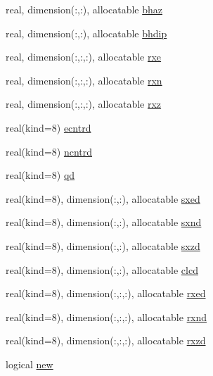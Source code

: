 \begin{DoxyCompactItemize}
\item 
real, dimension(\+:,\+:), allocatable \hyperlink{namespacemg__input__routines_a028ce31030b8cbaac07934598f1bb0b3}{bhaz}
\item 
real, dimension(\+:,\+:), allocatable \hyperlink{namespacemg__input__routines_a2cf5a853bfa353bf9d25a57b6aac283a}{bhdip}
\item 
real, dimension(\+:,\+:,\+:), allocatable \hyperlink{namespacemg__input__routines_a107a688fa11bcfd8753c8250a50ba459}{rxe}
\item 
real, dimension(\+:,\+:,\+:), allocatable \hyperlink{namespacemg__input__routines_af8a2966f8b7dbe85319bd37e57631ae7}{rxn}
\item 
real, dimension(\+:,\+:,\+:), allocatable \hyperlink{namespacemg__input__routines_a97b256f49e649be206afebcd3ea97eb5}{rxz}
\item 
real(kind=8) \hyperlink{namespacemg__input__routines_aa1f05f7245fd87ee0872f3d87b6f5711}{ecntrd}
\item 
real(kind=8) \hyperlink{namespacemg__input__routines_a7a7ebfe0ae5724156d7e5a4bc92d1b7a}{ncntrd}
\item 
real(kind=8) \hyperlink{namespacemg__input__routines_a2209bb7dd2f702a500cff15b254ea118}{qd}
\item 
real(kind=8), dimension(\+:,\+:), allocatable \hyperlink{namespacemg__input__routines_a148ea345433a4a23b86d112f33055942}{sxed}
\item 
real(kind=8), dimension(\+:,\+:), allocatable \hyperlink{namespacemg__input__routines_a37d88ac022398dee17396a07fc8e8be7}{sxnd}
\item 
real(kind=8), dimension(\+:,\+:), allocatable \hyperlink{namespacemg__input__routines_ab1f662ce65466e18b9990781d43c69a6}{sxzd}
\item 
real(kind=8), dimension(\+:,\+:), allocatable \hyperlink{namespacemg__input__routines_a3f4fc21cf71d14b405a57f9ede298ded}{clcd}
\item 
real(kind=8), dimension(\+:,\+:,\+:), allocatable \hyperlink{namespacemg__input__routines_ac5fa3dbae21f3b50a0d459cd16b5f71e}{rxed}
\item 
real(kind=8), dimension(\+:,\+:,\+:), allocatable \hyperlink{namespacemg__input__routines_a0d3dec62594ac0a9bb0c284a3d60738d}{rxnd}
\item 
real(kind=8), dimension(\+:,\+:,\+:), allocatable \hyperlink{namespacemg__input__routines_a3ad7b0263bc7a7f0977d8d3ab49cd027}{rxzd}
\item 
logical \hyperlink{namespacemg__input__routines_a733484f25916ecd427704c6769db1ba1}{new}

\end{DoxyCompactItemize}
